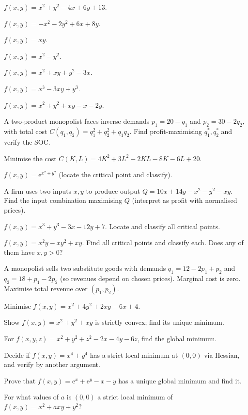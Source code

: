 \begin{problems}
    \item $f(x, y) = x^2 + y^2 - 4 x + 6 y + 13$.
    \item $f(x, y) = -x^2 - 2 y^2 + 6 x + 8 y$.
    \item $f(x, y) = x y$.
    \item $f(x, y) = x^2 - y^2$.
    \item $f(x, y) = x^2 + x y + y^2 - 3 x$.
    \item $f(x, y) = x^3 - 3 x y + y^3$.
    \item $f(x, y) = x^2 + y^2 + x y - x - 2 y$.
    \item A two-product monopolist faces inverse demands $p_1 = 20 - q_1$ and $p_2 = 30 - 2 q_2$, with total cost $C(q_1, q_2) = q_1^2 + q_2^2 + q_1 q_2$. Find profit-maximising $q_1^*, q_2^*$ and verify the SOC.
    \item Minimise the cost $C(K, L) = 4 K^2 + 3 L^2 - 2 K L - 8 K - 6 L + 20$.
    \item $f(x, y) = \mathrm{e}^{x^2 + y^2}$ (locate the critical point and classify).
    \item A firm uses two inputs $x, y$ to produce output $Q = 10 x + 14 y - x^2 - y^2 - x y$. Find the input combination maximising $Q$ (interpret as profit with normalised prices).
    \item $f(x, y) = x^3 + y^3 - 3 x - 12 y + 7$. Locate and classify all critical points.
    \item $f(x, y) = x^2 y - x y^2 + x y$. Find all critical points and classify each. Does any of them have $x, y > 0$?
    \item A monopolist sells two substitute goods with demands $q_1 = 12 - 2 p_1 + p_2$ and $q_2 = 18 + p_1 - 2 p_2$ (so revenues depend on chosen prices). Marginal cost is zero. Maximise total revenue over $(p_1, p_2)$.
    \item Minimise $f(x, y) = x^2 + 4 y^2 + 2 x y - 6 x + 4$.
    \item Show $f(x,y) = x^2 + y^2 + xy$ is strictly convex; find its unique minimum.
    \item For $f(x,y,z) = x^2 + y^2 + z^2 - 2x - 4y - 6z$, find the global minimum.
    \item Decide if $f(x,y) = x^4 + y^4$ has a strict local minimum at $(0,0)$ via Hessian, and verify by another argument.
    \item Prove that $f(x,y) = \mathrm{e}^x + \mathrm{e}^y - x - y$ has a unique global minimum and find it.
    \item For what values of $a$ is $(0,0)$ a strict local minimum of $f(x,y) = x^2 + axy + y^2$?
\end{problems}

